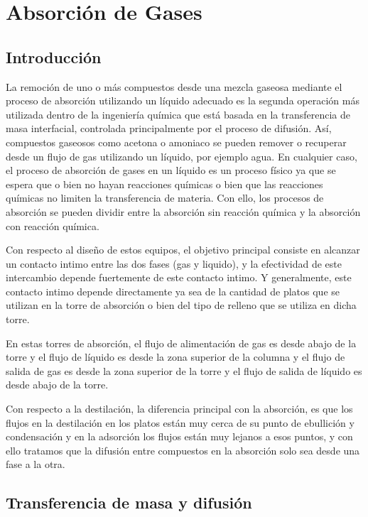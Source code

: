 \documentclass[11pt]{book}
\begin{document}
\chapter{Absorción de Gases}

\section{Introducción}

La remoción de uno o más compuestos desde una mezcla gaseosa mediante el proceso de absorción utilizando un líquido adecuado es la segunda operación más utilizada dentro de la ingeniería química que está basada en la transferencia de masa interfacial, controlada principalmente por el proceso de difusión. Así, compuestos gaseosos como acetona o amoniaco se pueden remover o recuperar desde un flujo de gas utilizando un líquido, por ejemplo agua. En cualquier caso, el proceso de absorción de gases en un líquido es un proceso físico ya que se espera que o bien no hayan reacciones químicas o bien que las reacciones químicas no limiten la transferencia de materia. Con ello, los procesos de absorción se pueden dividir entre la absorción sin reacción química y la absorción con reacción química. 

Con respecto al diseño de estos equipos, el objetivo principal consiste en alcanzar un contacto intimo entre las dos fases (gas y liquido), y la efectividad de este intercambio depende fuertemente de este contacto intimo. Y generalmente, este contacto intimo depende directamente ya sea de la cantidad de platos que se utilizan en la torre de absorción o bien del tipo de relleno que se utiliza en dicha torre. 

En estas torres de absorción, el flujo de alimentación de gas es desde abajo de la torre y el flujo de líquido es desde la zona superior de la columna y el flujo de salida de gas es desde la zona superior de la torre y el flujo de salida de líquido es desde abajo de la torre. 

Con respecto a la destilación, la diferencia principal con la absorción, es que los flujos en la destilación en los platos están muy cerca de su punto de ebullición y condensación y en la adsorción los flujos están muy lejanos a esos puntos, y con ello tratamos que la difusión entre compuestos en la absorción solo sea desde una fase a la otra. 

\section{Transferencia de masa y difusión}
\end{document}
